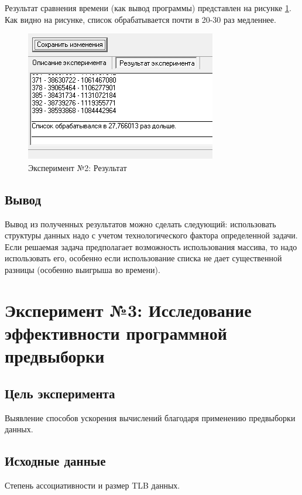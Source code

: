 Результат сравнения времени (как вывод программы) представлен на рисунке \ref{ex:t2-data}. Как видно на рисунке, список обрабатывается почти в 20-30 раз медленнее.

\begin{figure}[h]
	\centering
	\includegraphics[height=0.25\textheight]{img/t2-data}
	\caption{Эксперимент №2: Результат}
	\label{ex:t2-data}
\end{figure}

\newpage

\subsection*{Вывод}
Вывод из полученных результатов можно сделать следующий: использовать структуры данных надо с учетом технологического фактора определенной задачи. Если решаемая задача предполагает возможность использования массива, то надо использовать его, особенно если использование списка не дает существенной разницы (особенно выигрыша во времени).

\newpage

\section*{Эксперимент №3: Исследование эффективности программной предвыборки}

\subsection*{Цель эксперимента}
Выявление способов ускорения вычислений благодаря применению предвыборки данных. 

\subsection*{Исходные данные}
Степень ассоциативности и размер TLB данных.


